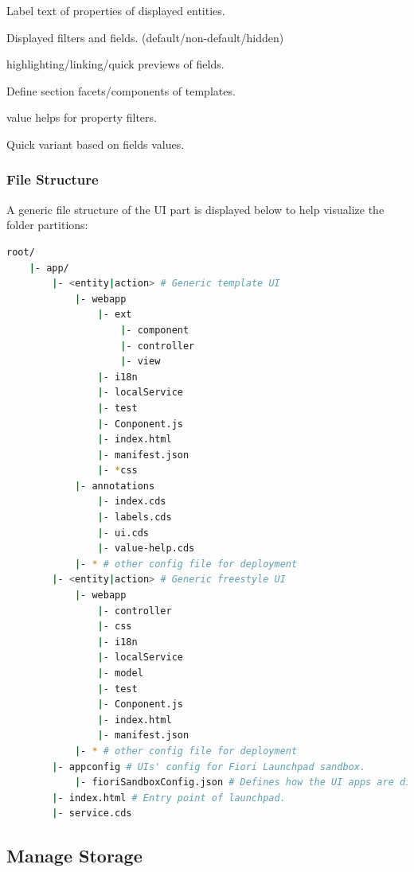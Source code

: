 \begin{compactenum}
    \item Label text of properties of displayed entities.
    \item Displayed filters and fields. (default/non-default/hidden)
    \item highlighting/linking/quick previews of fields.
    \item Define section facets/components of templates.
    \item value helps for property filters.
    \item Quick variant based on fields values.
\end{compactenum}

\subsubsection{File Structure}

A generic file structure of the UI part is displayed below to help visualize the folder partitions: 

\begin{lstlisting}[language={bash}]
root/
    |- app/
        |- <entity|action> # Generic template UI
            |- webapp
                |- ext
                    |- component 
                    |- controller
                    |- view
                |- i18n
                |- localService
                |- test
                |- Conponent.js
                |- index.html
                |- manifest.json
                |- *css 
            |- annotations
                |- index.cds
                |- labels.cds
                |- ui.cds
                |- value-help.cds
            |- * # other config file for deployment
        |- <entity|action> # Generic freestyle UI
            |- webapp
                |- controller
                |- css
                |- i18n
                |- localService
                |- model
                |- test
                |- Conponent.js
                |- index.html
                |- manifest.json
            |- * # other config file for deployment
        |- appconfig # UIs' config for Fiori Launchpad sandbox.
            |- fioriSandboxConfig.json # Defines how the UI apps are dispalyed and navigated.
        |- index.html # Entry point of launchpad.
        |- service.cds
\end{lstlisting}

\subsection{Manage Storage}

